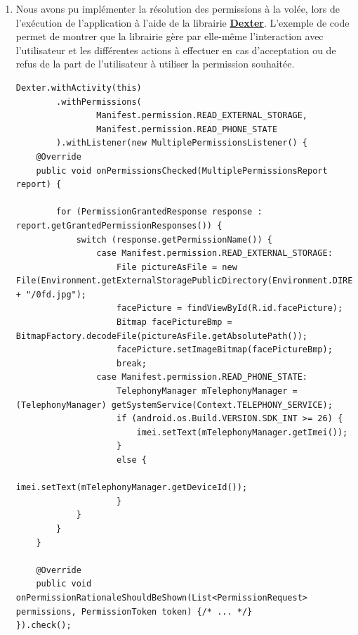 \documentclass[a4paper]{article}
\begin{document}
\begin{enumerate}
    \newpage
    
    \item Nous avons pu implémenter la résolution des permissions à la volée, lors de l'exécution de l'application à l'aide de la librairie \href{https://github.com/Karumi/Dexter}{\textbf{Dexter}}. L'exemple de code permet de montrer que la librairie gère par elle-même l'interaction avec l'utilisateur et les différentes actions à effectuer en cas d'acceptation ou de refus de la part de l'utilisateur à utiliser la permission souhaitée.
    
\begin{lstlisting}
Dexter.withActivity(this)
        .withPermissions(
                Manifest.permission.READ_EXTERNAL_STORAGE,
                Manifest.permission.READ_PHONE_STATE
        ).withListener(new MultiplePermissionsListener() {
    @Override
    public void onPermissionsChecked(MultiplePermissionsReport report) {

        for (PermissionGrantedResponse response : report.getGrantedPermissionResponses()) {
            switch (response.getPermissionName()) {
                case Manifest.permission.READ_EXTERNAL_STORAGE:
                    File pictureAsFile = new File(Environment.getExternalStoragePublicDirectory(Environment.DIRECTORY_DOWNLOADS).getAbsolutePath() + "/0fd.jpg");
                    facePicture = findViewById(R.id.facePicture);
                    Bitmap facePictureBmp = BitmapFactory.decodeFile(pictureAsFile.getAbsolutePath());
                    facePicture.setImageBitmap(facePictureBmp);
                    break;
                case Manifest.permission.READ_PHONE_STATE:
                    TelephonyManager mTelephonyManager = (TelephonyManager) getSystemService(Context.TELEPHONY_SERVICE);
                    if (android.os.Build.VERSION.SDK_INT >= 26) {
                        imei.setText(mTelephonyManager.getImei());
                    }
                    else {
                        imei.setText(mTelephonyManager.getDeviceId());
                    }
            }
        }
    }

    @Override
    public void onPermissionRationaleShouldBeShown(List<PermissionRequest> permissions, PermissionToken token) {/* ... */}
}).check();
\end{lstlisting}
    
    
\end{enumerate}
\end{document}
